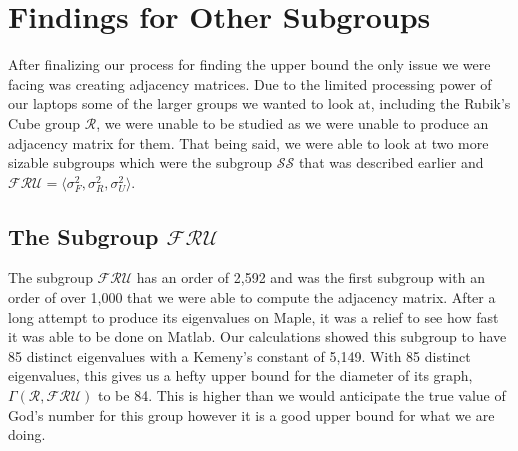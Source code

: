 \documentclass{article}
\begin{document}
\section{Findings for Other Subgroups}
After finalizing our process for finding the upper bound the only issue we were facing was creating adjacency matrices.  Due to the limited processing power of our laptops some of the larger groups we wanted to look at, including the Rubik's Cube group $\mathcal{R}$, we were unable to be studied as we were unable to produce an adjacency matrix for them.  That being said, we were able to look at two more sizable subgroups which were the subgroup $\mathcal{SS}$ that was described earlier and $\mathcal{FRU} = \langle \sigma_F^2, \sigma_R^2, \sigma_U^2 \rangle$.

\subsection{The Subgroup $\mathcal{FRU}$}
The subgroup $\mathcal{FRU}$ has an order of 2,592 and was the first subgroup with an order of over 1,000 that we were able to compute the adjacency matrix.  After a long attempt to produce its eigenvalues on Maple, it was a relief to see how fast it was able to be done on Matlab. Our calculations showed this subgroup to have 85 distinct eigenvalues with a Kemeny's constant of 5,149.  With 85 distinct eigenvalues, this gives us a hefty upper bound for the diameter of its graph, $\Gamma(\mathcal{R}, \mathcal{FRU})$ to be 84.  This is higher than we would anticipate the true value of God's number for this group however it is a good upper bound for what we are doing. 
\end{document}
